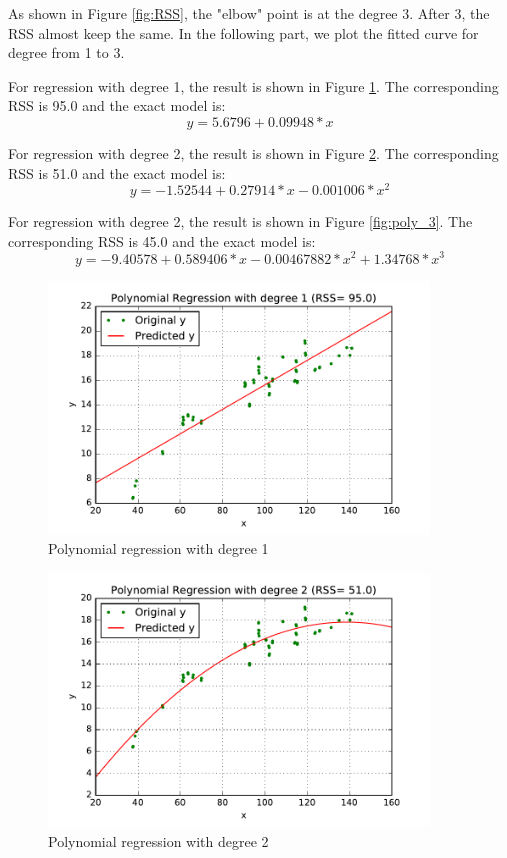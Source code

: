 \begin{description}
As shown in Figure \ref{fig:RSS}, the "elbow" point is at the degree 3. After 3, the RSS almost keep the same. In the following part, we plot the fitted curve for degree from 1 to 3.

For regression with degree 1, the result is shown in Figure \ref{fig:poly_1}. The corresponding RSS is 95.0 and the exact model is:
$$y = 5.6796 + 0.09948 * x $$ 
 
For regression with degree 2, the result is shown in Figure \ref{fig:poly_2}. The corresponding RSS is 51.0 and the exact model is:
$$y = -1.52544 + 0.27914 * x - 0.001006 * x^2 $$

For regression with degree 2, the result is shown in Figure \ref{fig:poly_3}. The corresponding RSS is 45.0 and the exact model is:
$$y = -9.40578 + 0.589406 * x - 0.00467882 * x^2  + 1.34768 * x^3 $$

\begin{figure}[H]
\centering
\includegraphics[width=0.9\textwidth]{./figures/poly_1.pdf}
\caption{\label{fig:poly_1} Polynomial regression with degree 1}
\end{figure}


\begin{figure}[H]
\centering
\includegraphics[width=0.9\textwidth]{./figures/poly_2.pdf}
\caption{\label{fig:poly_2} Polynomial regression with degree 2}
\end{figure}
 

\end{description}

